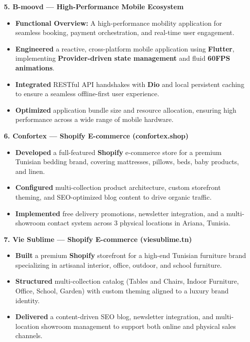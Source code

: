 \documentclass[10pt, letterpaper]{article}
\newenvironment{highlights}{
\begin{itemize}[leftmargin=12pt, itemsep=2pt]
}{
\end{itemize}
}
\begin{document}
\textbf{5. B-moovd --- High-Performance Mobile Ecosystem}
\begin{highlights}
\item \textbf{Functional Overview:} A high-performance mobility application for seamless booking, payment orchestration, and real-time user engagement.
\item \textbf{Engineered} a reactive, cross-platform mobile application using \textbf{Flutter}, implementing \textbf{Provider-driven state management} and fluid \textbf{60FPS animations}.
\item \textbf{Integrated} RESTful API handshakes with \textbf{Dio} and local persistent caching to ensure a seamless offline-first user experience.
\item \textbf{Optimized} application bundle size and resource allocation, ensuring high performance across a wide range of mobile hardware.
\end{highlights}

\textbf{6. Confortex --- Shopify E-commerce (confortex.shop)}
\begin{highlights}
\item \textbf{Developed} a full-featured \textbf{Shopify} e-commerce store for a premium Tunisian bedding brand, covering mattresses, pillows, beds, baby products, and linen.
\item \textbf{Configured} multi-collection product architecture, custom storefront theming, and SEO-optimized blog content to drive organic traffic.
\item \textbf{Implemented} free delivery promotions, newsletter integration, and a multi-showroom contact system across 3 physical locations in Ariana, Tunisia.
\end{highlights}

\textbf{7. Vie Sublime --- Shopify E-commerce (viesublime.tn)}
\begin{highlights}
\item \textbf{Built} a premium \textbf{Shopify} storefront for a high-end Tunisian furniture brand specializing in artisanal interior, office, outdoor, and school furniture.
\item \textbf{Structured} multi-collection catalog (Tables and Chairs, Indoor Furniture, Office, School, Garden) with custom theming aligned to a luxury brand identity.
\item \textbf{Delivered} a content-driven SEO blog, newsletter integration, and multi-location showroom management to support both online and physical sales channels.
\end{highlights}
\end{document}
